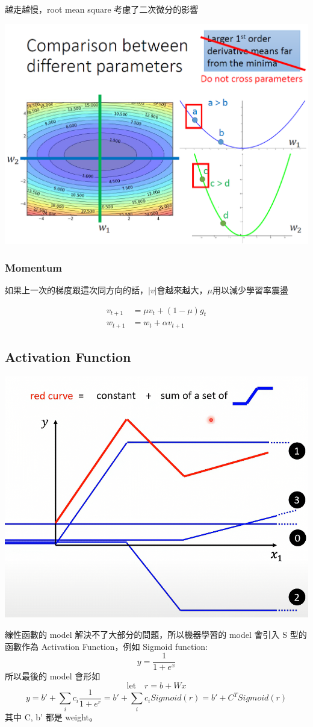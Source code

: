越走越慢，root mean square 考慮了二次微分的影響


\includegraphics[width=.8\textwidth]{paste_src/2025-03-20-06-21-55.png}
\subsubsection*{Momentum}
如果上一次的梯度跟這次同方向的話，$|v|$會越來越大，$\mu$用以減少學習率震盪

\begin{align}
  v_{t+1} &= \mu v_{t} + (1-\mu) g_t \\
  w_{t+1} &= w_t + \alpha v_{t+1}
\end{align}





\subsection{Activation Function}
\includegraphics[width=.6\textwidth]{paste_src/2025-03-20-03-47-32.png}

線性函數的 model 解決不了大部分的問題，所以機器學習的 model 會引入 S 型的函數作為 Activation Function，例如 Sigmoid function:
$$
y= \frac{1}{1+e^x}
$$
所以最後的 model 會形如 
$$
\mbox{let}\quad r = b + Wx 
$$
$$
y = b'+\sum_i c_i \frac{1}{1+e^{r}} = b' + \sum_i c_i Sigmoid(r) = b' + C^TSigmoid(r)
$$
其中 C, b' 都是 weight。


